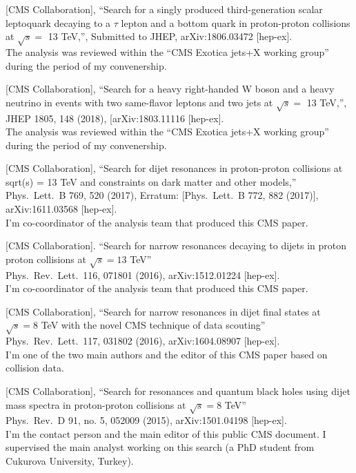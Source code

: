 \documentclass[10pt, a4paper]{article}
\begin{document}
\begin{thebibliography}{599}
 [CMS Collaboration],
  ``Search for a singly produced third-generation scalar leptoquark
  decaying to a $\tau$ lepton and a bottom quark in proton-proton
  collisions at $\sqrt{s} =$ 13 TeV,'', Submitted to JHEP, arXiv:1806.03472 [hep-ex]. \\
The analysis was reviewed within the ``CMS Exotica jets+X working
group'' during the period of my convenership.

 [CMS Collaboration],
  ``Search for a heavy right-handed W boson and a heavy neutrino in
  events with two same-flavor leptons and two jets at $\sqrt{s}=$ 13
  TeV,'', JHEP 1805, 148 (2018), [arXiv:1803.11116 [hep-ex]. \\
The analysis was reviewed within the ``CMS Exotica jets+X working
group'' during the period of my convenership.

  [CMS Collaboration],
  ``Search for dijet resonances in proton-proton collisions at sqrt(s) = 13 TeV and constraints on dark matter and other models,''\\
  Phys.\ Lett.\ B 769, 520 (2017), Erratum: [Phys.\ Lett.\ B 772, 882 (2017)], arXiv:1611.03568 [hep-ex].\\
  I'm co-coordinator of the analysis team that produced this CMS paper.
 
  [CMS Collaboration].
  ``Search for narrow resonances decaying to  dijets in proton
    proton collisions at $\sqrt{s}=13$ TeV''\\
  Phys.\ Rev.\ Lett.\  116, 071801 (2016), arXiv:1512.01224 [hep-ex].\\
I'm co-coordinator of the analysis team that produced this CMS paper.

[CMS Collaboration],
  ``Search for narrow resonances in dijet final states at $\sqrt{s}=8$
  TeV with the novel CMS technique of data scouting''\\
  Phys.\ Rev.\ Lett.\  117, 031802 (2016), arXiv:1604.08907 [hep-ex].
\\I'm one of the two main authors and the editor of this CMS paper based on
collision data.

  [CMS Collaboration],
  ``Search for resonances and quantum black holes using dijet mass
  spectra in proton-proton collisions at $\sqrt{s}=8$ TeV''\\
  Phys.\ Rev.\ D 91, no. 5, 052009 (2015), arXiv:1501.04198 [hep-ex].
  \\I'm the contact person and the main editor of this public CMS document. I supervised the main analyst working on this search (a PhD student from Cukurova University, Turkey).


\end{thebibliography}
\end{document}
